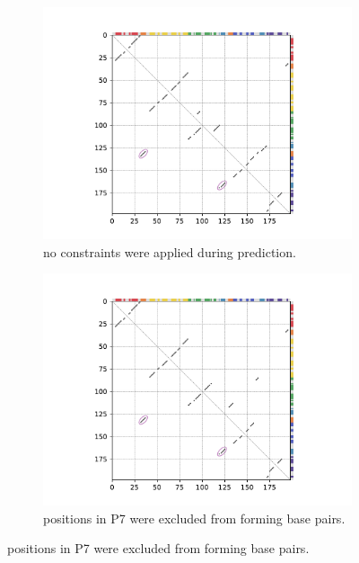 \documentclass[../../master.tex]{subfiles}
\begin{document}
\begin{figure}[!ht]
	\centering
	\begin{subfigure}[t]{0.5\textwidth}
		\centering
		\includegraphics[trim=55 10 70 10, clip, width=\textwidth]{pic/results/designs/dotplots/azo_rnafoldpred.pdf}
		\caption{no constraints were applied during prediction.
		}\label{fig:rnafold_constraint:a}
	\end{subfigure}%
	\begin{subfigure}[t]{0.5\textwidth}
		\centering
		\includegraphics[trim=55 10 70 10, clip, width=\textwidth]{pic/results/designs/dotplots/azo_rnafoldpred_p7constraint.pdf}
		\caption{positions in P7 were excluded from forming base pairs.
		}\label{fig:rnafold_constraint:b}

\end{subfigure}
\end{figure}
\end{document}
